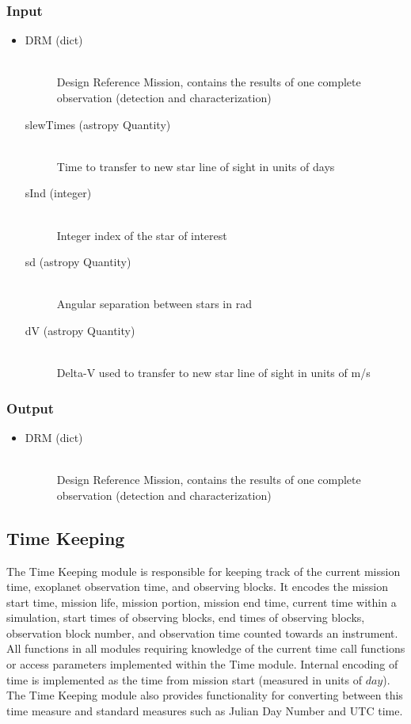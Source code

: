 \documentclass[cleanfoot]{asme2ej}
\begin{document}
\subsubsection*{Input}
\begin{itemize}
\item
\begin{description}
    \item[DRM (dict)] \hfill \\ Design Reference Mission, contains the results of one complete observation (detection and characterization)
    \item[slewTimes (astropy Quantity)] \hfill \\ Time to transfer to new star line of sight in units of days
    \item[sInd (integer)] \hfill \\ Integer index of the star of interest
    \item[sd (astropy Quantity)] \hfill \\ Angular separation between stars in rad
    \item[dV (astropy Quantity)] \hfill \\ Delta-V used to transfer to new star line of sight in units of m/s
\end{description}
\end{itemize}
\subsubsection*{Output}
\begin{itemize}
\item
\begin{description}
    \item[DRM (dict)] \hfill \\ Design Reference Mission, contains the results of one complete observation (detection and characterization)
\end{description}
\end{itemize}



\subsection{Time Keeping} \label{sec:timekeeping}
The Time Keeping module is responsible for keeping track of the current mission time, exoplanet observation time, and observing blocks.  It encodes the mission start time, mission life, mission portion, mission end time, current time within a simulation, start times of observing blocks, end times of observing blocks, observation block number, and observation time counted towards an instrument.  All functions in all modules requiring knowledge of the current time call functions or access parameters implemented within the Time module.  Internal encoding of time is implemented as the time from mission start (measured in units of $ day $).  The Time Keeping module also provides functionality for converting between this time measure and standard measures such as Julian Day Number and UTC time.
 
\end{document}
